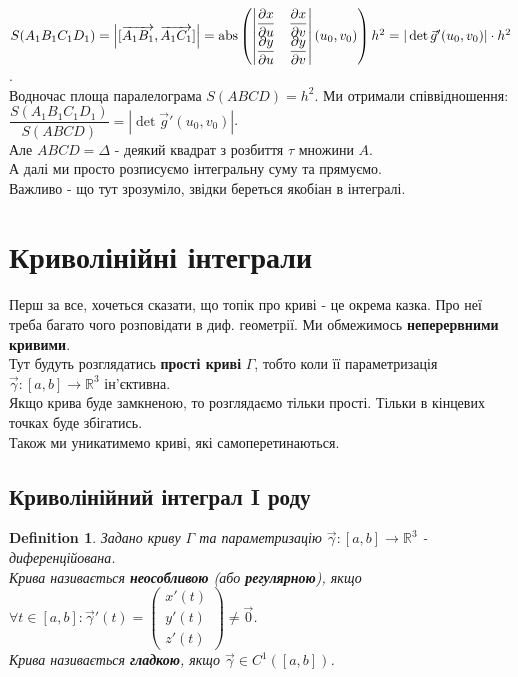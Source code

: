 \documentclass[a4paper, 10pt]{article}
\def\departial#1#2{\dfrac{\partial {#1}}{\partial {#2}}}
\theoremstyle{theoremdd}
\theoremstyle{theoremdd}
\newtheorem{definition}[theorem]{Definition}
\theoremstyle{theoremdd}
\theoremstyle{theoremdd}
\theoremstyle{theoremdd}
\theoremstyle{theoremdd}
\theoremstyle{theoremdd}
\theoremstyle{theoremdd}
\theoremstyle{theoremdd}
\theoremstyle{theoremdd}
\theoremstyle{theoremdd}
\theoremstyle{theoremdd}
\theoremstyle{theoremdd}
\theoremstyle{theoremdd}
\theoremstyle{theoremdd}
\begin{document}
$S(A_1B_1C_1D_1) = \abs{[\overrightarrow{A_1B_1},\overrightarrow{A_1C_1}]} = \text{abs} \left(\begin{vmatrix}
\departial{x}{u} & \departial{x}{v} \\
\departial{y}{u} & \departial{y}{v}
\end{vmatrix} (u_0,v_0) \right) h^2 = |\det \vec{g}'(u_0,v_0)| \cdot h^2$.\\
Водночас площа паралелограма $S(ABCD) = h^2$. Ми отримали співвідношення:\\
$\dfrac{S(A_1B_1C_1D_1)}{S(ABCD)} = |\det \vec{g}'(u_0,v_0)|$.\\
Але $ABCD = \Delta$ - деякий квадрат з розбиття $\tau$ множини $A$.\\
А далі ми просто розписуємо інтегральну суму та прямуємо.\\
Важливо - що тут зрозуміло, звідки береться якобіан в інтегралі.
\newpage

\newpage
\section{Криволінійні інтеграли}
Перш за все, хочеться сказати, що топік про криві - це окрема казка. Про неї треба багато чого розповідати в диф. геометрії. Ми обмежимось \textbf{неперервними кривими}.\\
Тут будуть розглядатись \textbf{прості криві} $\Gamma$, тобто коли її параметризація $\vec{\gamma}: [a,b] \to \mathbb{R}^3$ ін'єктивна.\\
Якщо крива буде замкненою, то розглядаємо тільки прості. Тільки в кінцевих точках буде збігатись.\\
Також ми уникатимемо криві, які самоперетинаються.

\subsection{Криволінійний інтеграл I роду}
\begin{definition}
Задано криву $\Gamma$ та параметризацію $\vec{\gamma}: [a,b] \to \mathbb{R}^3$ - диференційована.\\
Крива називається \textbf{неособливою} (або \textbf{регулярною}), якщо $\forall t \in [a,b]: \vec{\gamma}'(t) = \begin{pmatrix}
x'(t) \\ y'(t) \\ z'(t)
\end{pmatrix} \neq \vec{0}$.\\
Крива називається \textbf{гладкою}, якщо $\vec{\gamma} \in C^1([a,b])$.
\end{definition}
\end{document}
